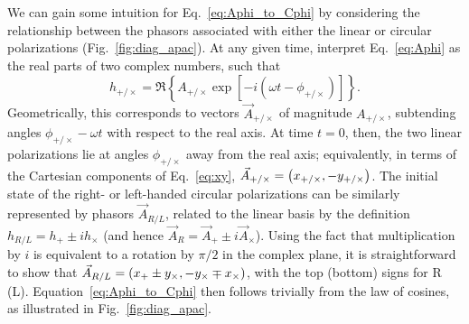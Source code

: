 \documentclass[aps,prd,twocolumn,superscriptaddress,preprintnumbers,floatfix,nofootinbib]{revtex4-2}
\newcommand{\beq}{\begin{equation}}
\newcommand{\eeq}{\end{equation}}
\begin{document}
We can gain some intuition for Eq.~\eqref{eq:Aphi_to_Cphi} by considering the relationship between the phasors associated with either the linear or circular polarizations (Fig.~\ref{fig:diag_apac}).
At any given time, interpret Eq.~\eqref{eq:Aphi} as the real parts of two complex numbers, such that
\beq
h_{+/\times} = \Re \left\{ A_{+/\times} \exp[-i\left(\omega t - \phi_{+/\times}\right)] \right\} .
\eeq 
Geometrically, this corresponds to vectors $\vec{A}_{+/\times}$ of magnitude $A_{+/\times}$, subtending angles $\phi_{+/\times} - \omega t$ with respect to the real axis.
At time $t=0$, then, the two linear polarizations lie at angles $\phi_{+/\times}$ away from the real axis; equivalently, in terms of the Cartesian components of Eq.~\eqref{eq:xy}, $\vec{A}_{+/\times} = \left(x_{+/\times}, - y_{+/\times} \right)$.
The initial state of the right- or left-handed circular polarizations can be similarly represented by phasors $\vec{A}_{R/L}$, related to the linear basis by the definition $h_{R/L} = h_+ \pm i h_\times$ (and hence $\vec{A}_R = \vec{A}_+ \pm i \vec{A}_\times$).
Using the fact that multiplication by $i$ is equivalent to a rotation by $\pi/2$ in the complex plane, it is straightforward to show that $\vec{A}_{R/L} = \left(x_{+} \pm y_{\times}, -y_{\times} \mp x_{\times}\right)$, with the top (bottom) signs for R (L).
Equation~\eqref{eq:Aphi_to_Cphi} then follows trivially from the law of cosines, as illustrated in Fig.~\ref{fig:diag_apac}.
\end{document}
